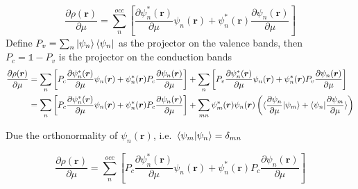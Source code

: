 \begin{frame}[allowframebreaks]
  \begin{equation*}
    \frac{
      \partial \rho(\boldsymbol{r})
    }{
      \partial \mu
    }
    =
    \sum_n^{occ}
    \left[
        \frac{
        \partial \psi_n^*(\boldsymbol{r})
        }{
        \partial \mu
        }
        \psi_n(\boldsymbol{r})
        +
        \psi_n^*(\boldsymbol{r})
        \frac{
        \partial \psi_n(\boldsymbol{r})
        }{
        \partial \mu
        }
    \right]
  \end{equation*}
  Define $P_v = \sum_n \ket{\psi_n}\bra{\psi_n}$ as the projector on the valence
  bands, then $P_c = \mathbb{1} - P_v$ is the projector on the conduction bands
  \begin{align*}
    \frac{
      \partial \rho(\boldsymbol{r})
    }{
      \partial \mu
    }
    &=
    \sum_n
    \left[
      P_c
        \frac{
        \partial \psi_n^*(\boldsymbol{r})
        }{
        \partial \mu
        }
        \psi_n(\boldsymbol{r})
        +
        \psi_n^*(\boldsymbol{r})
        P_c
        \frac{
        \partial \psi_n(\boldsymbol{r})
        }{
        \partial \mu
        }
    \right]
    +
    \sum_n
    \left[
      P_v
        \frac{
        \partial \psi_n^*(\boldsymbol{r})
        }{
        \partial \mu
        }
        \psi_n(\boldsymbol{r})
        +
        \psi_n^*(\boldsymbol{r})
        P_v
        \frac{
        \partial \psi_n(\boldsymbol{r})
        }{
        \partial \mu
        }
    \right] \\
    &=
    \sum_n
    \left[
      P_c
        \frac{
        \partial \psi_n^*(\boldsymbol{r})
        }{
        \partial \mu
        }
        \psi_n(\boldsymbol{r})
        +
        \psi_n^*(\boldsymbol{r})
        P_c
        \frac{
        \partial \psi_n(\boldsymbol{r})
        }{
        \partial \mu
        }
    \right]
    +
    \sum_{mn}
      \psi^*_m(\boldsymbol{r})
      \psi_n(\boldsymbol{r})
      \left(
      \braket{
        \frac{
        \partial \psi_n
        }{
        \partial \mu
        }
        |
        \psi_m
      }
      +
      \braket{
        \psi_n
        |
        \frac{
        \partial \psi_m
        }{
        \partial \mu
        }
      }
      \right)
  \end{align*}

  Due the orthonormality of $\psi_n(\boldsymbol{r})$, i.e.\ $\braket{\psi_m | \psi_n} = \delta_{mn}$

  \begin{equation}
    \label{eq:density_response}
    \frac{
      \partial \rho(\boldsymbol{r})
    }{
      \partial \mu
    }
    =
    \sum_n^{occ}
    \left[
      P_c
        \frac{
        \partial \psi_n^*(\boldsymbol{r})
        }{
        \partial \mu
        }
        \psi_n(\boldsymbol{r})
        +
        \psi_n^*(\boldsymbol{r})
        P_c
        \frac{
        \partial \psi_n(\boldsymbol{r})
        }{
        \partial \mu
        }
    \right]
  \end{equation}
 
\end{frame}

